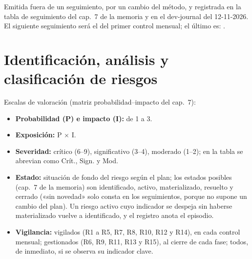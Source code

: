 \documentclass[11pt,a4paper]{article}
\begin{document}
Emitida fuera de un seguimiento, por un cambio del método, y registrada en la tabla de seguimiento del cap.~7 de la memoria y en el dev-journal del 12-11-2026.
El siguiente seguimiento será el del primer control mensual; el último es:\newline
{}.

\section{Identificación, análisis y clasificación de riesgos}

Escalas de valoración (matriz probabilidad--impacto del cap.~7):
\begin{itemize}
  \item \textbf{Probabilidad (P) e impacto (I):} de 1 a 3.
  \item \textbf{Exposición:} P \(\times\) I.
  \item \textbf{Severidad:} crítico (6–9), significativo (3–4), moderado (1–2); en la tabla se abrevian como Crít., Sign. y Mod.
  \item \textbf{Estado:} situación de fondo del riesgo según el plan; los estados posibles (cap.~7 de la memoria) son identificado, activo, materializado, resuelto y cerrado («sin novedad» solo consta en los seguimientos, porque no supone un cambio del plan).
  Un riesgo activo cuyo indicador se despeja sin haberse materializado vuelve a identificado, y el registro anota el episodio.
  \item \textbf{Vigilancia:} vigilados (R1 a R5, R7, R8, R10, R12 y R14), en cada control mensual; gestionados (R6, R9, R11, R13 y R15), al cierre de cada fase; todos, de inmediato, si se observa su indicador clave.
\end{itemize}
\end{document}
